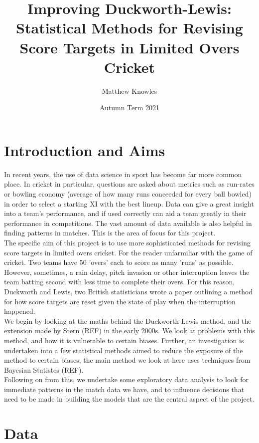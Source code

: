\documentclass[11pt]{amsart}
\title{Improving Duckworth-Lewis: Statistical Methods for Revising Score Targets in Limited Overs Cricket}
\author{Matthew Knowles}
\date{Autumn Term 2021}
\begin{document}
\maketitle

\section{Introduction and Aims}
In recent years, the use of data science in sport has become far more common place. In cricket in particular, questions are asked about metrics such 
as run-rates or bowling economy (average of how many runs conceeded for every ball bowled) in order to select a starting XI with the best lineup. 
Data can give a great insight into a team's performance, and if used correctly can aid a team greatly in their performance in competitions.  The vast amount
of data available is also helpful in finding patterns in matches. This is the area of focus for this project. \\

The specific aim of this project is to use more sophisticated methods for revising score targets in limited overs cricket. For the reader unfarmiliar 
with the game of cricket. Two teams have 50 'overs' each to score as many 'runs' as possible. However, sometimes, a rain delay, pitch invasion 
or other interruption leaves the team batting second with less time to complete their overs. For this reason, Duckworth and Lewis, two British 
statisticians wrote a paper outlining a method for how score targets are reset given the state of play when the interruption happened. \citep{duckworth} \\

We begin by looking at the maths behind the Duckworth-Lewis method, and the extension made by Stern (REF) in the early 2000s. We look at problems
with this method, and how it is vulnerable to certain biases. Further, an investigation is undertaken into a few statistical methods aimed to 
reduce the exposure of the method to certain biases, the main method we look at here uses techniques from Bayesian Statistcs (REF).\\

Following on from this, we undertake some exploratory data analysis to look for immediate patterns in the match data we have, and to influence decisions
that need to be made in building the models that are the central aspect of the project. 

\section{Data}
\end{document}
